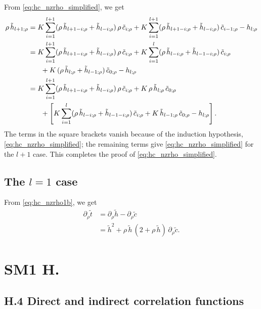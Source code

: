 \documentclass[preprint]{revtex4-1}
\numberwithin{equation}{subsection}
\numberwithin{table}{section}
\begin{document}
From \eqref{eq:hc_nzrho_simplified},
we get
\begin{align*}
  \rho \, \tilde h_{l+1;\rho}
&=
  K \sum_{i = 1}^{l+1}
  (\rho \, \tilde h_{l+1-i;\rho} + \tilde h_{l-i;\rho}) \,
  \rho \, \tilde c_{i;\rho}
+
  K \sum_{i = 1}^{l+1}
  (\rho \, \tilde h_{l+1-i;\rho} + \tilde h_{l-i;\rho}) \,
  \tilde c_{i-1;\rho}
-
  h_{l;\rho}
%
%
%
\\
&=
  K \sum_{i = 1}^{l+1}
  (\rho \, \tilde h_{l+1-i;\rho} + \tilde h_{l-i;\rho}) \,
  \rho \, \tilde c_{i;\rho}
+
  K \sum_{i = 1}^{l}
  (\rho \, \tilde h_{l-i;\rho} + \tilde h_{l-1-i;\rho}) \,
  \tilde c_{i;\rho}
\\
&\hphantom{=\quad}
+ K \,
  (\rho \, \tilde h_{l;\rho} + \tilde h_{l-1;\rho}) \,
  \tilde c_{0;\rho}
-
  h_{l;\rho}
%
%
%
\\
&=
  K \sum_{i = 1}^{l+1}
  (\rho \, \tilde h_{l+1-i;\rho} + \tilde h_{l-i;\rho}) \,
  \rho \, \tilde c_{i;\rho}
+ K \,
  \rho \, \tilde h_{l;\rho} \,
  \tilde c_{0;\rho}
\\
&\hphantom{=\quad}
+
\left[
  K \sum_{i = 1}^{l}
  (\rho \, \tilde h_{l-i;\rho} + \tilde h_{l-1-i;\rho}) \,
  \tilde c_{i;\rho}
+ K \,
  \tilde h_{l-1;\rho} \,
  \tilde c_{0;\rho}
-
  h_{l;\rho}
\right].
%
%
%
\end{align*}
The terms in the square brackets vanish because of the induction hypothesis,
\eqref{eq:hc_nzrho_simplified};
the remaining terms give
\eqref{eq:hc_nzrho_simplified}
for the $l + 1$ case.
This completes the proof of
\eqref{eq:hc_nzrho_simplified}.




\subsection{The $l = 1$ case}

From \eqref{eq:hc_nzrho1b},
we get
\begin{align*}
\partial_\rho \tilde t
&=
\partial_\rho \tilde h
-
\partial_\rho \tilde c
\\
&=
\tilde h^2
+
\rho \, \tilde h \,
(2 + \rho \, \tilde h) \,
\partial_\rho \tilde c.
\end{align*}



\section{SM1 H.}


\subsection{H.4 Direct and indirect correlation functions}
\end{document}
